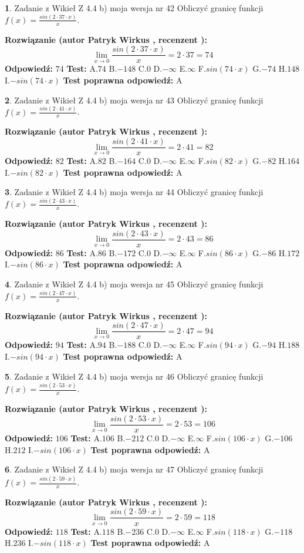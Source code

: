 \documentclass[12pt, a4paper]{article}
\theoremstyle{definition} %
\newtheorem{zad}{}
\newcommand{\zadStart}[1]{\begin{zad}#1\newline}
\newcommand{\zadStop}{\end{zad}}
\newcommand{\rozwStart}[2]{\noindent \textbf{Rozwiązanie (autor #1 , recenzent #2): }\newline}
\newcommand{\rozwStop}{\newline}
\newcommand{\odpStart}{\noindent \textbf{Odpowiedź:}\newline}
\newcommand{\odpStop}{\newline}
\newcommand{\testStart}{\noindent \textbf{Test:}\newline}
\newcommand{\testStop}{\newline}
\newcommand{\kluczStart}{\noindent \textbf{Test poprawna odpowiedź:}\newline}
\newcommand{\kluczStop}{\newline}
\begin{document}
\zadStart{Zadanie z Wikieł Z 4.4 b) moja wersja nr 42}
Obliczyć granicę funkcji $f(x)=\frac{sin(2 \cdot37\cdot x)}{x}$.
\zadStop
\rozwStart{Patryk Wirkus}{}
$$\lim\limits_{x\to 0}\frac{sin(2 \cdot 37\cdot x)}{x}=
2 \cdot 37 = 74$$
\rozwStop
\odpStart
$74$
\odpStop
\testStart
A.$74$
B.$-148$
C.$0$
D.$-\infty$
E.$\infty$
F.$sin(74\cdot x)$
G.$-74$
H.$148$
I.$-sin(74\cdot x)$
\testStop
\kluczStart
A
\kluczStop



\zadStart{Zadanie z Wikieł Z 4.4 b) moja wersja nr 43}
Obliczyć granicę funkcji $f(x)=\frac{sin(2 \cdot41\cdot x)}{x}$.
\zadStop
\rozwStart{Patryk Wirkus}{}
$$\lim\limits_{x\to 0}\frac{sin(2 \cdot 41\cdot x)}{x}=
2 \cdot 41 = 82$$
\rozwStop
\odpStart
$82$
\odpStop
\testStart
A.$82$
B.$-164$
C.$0$
D.$-\infty$
E.$\infty$
F.$sin(82\cdot x)$
G.$-82$
H.$164$
I.$-sin(82\cdot x)$
\testStop
\kluczStart
A
\kluczStop



\zadStart{Zadanie z Wikieł Z 4.4 b) moja wersja nr 44}
Obliczyć granicę funkcji $f(x)=\frac{sin(2 \cdot43\cdot x)}{x}$.
\zadStop
\rozwStart{Patryk Wirkus}{}
$$\lim\limits_{x\to 0}\frac{sin(2 \cdot 43\cdot x)}{x}=
2 \cdot 43 = 86$$
\rozwStop
\odpStart
$86$
\odpStop
\testStart
A.$86$
B.$-172$
C.$0$
D.$-\infty$
E.$\infty$
F.$sin(86\cdot x)$
G.$-86$
H.$172$
I.$-sin(86\cdot x)$
\testStop
\kluczStart
A
\kluczStop



\zadStart{Zadanie z Wikieł Z 4.4 b) moja wersja nr 45}
Obliczyć granicę funkcji $f(x)=\frac{sin(2 \cdot47\cdot x)}{x}$.
\zadStop
\rozwStart{Patryk Wirkus}{}
$$\lim\limits_{x\to 0}\frac{sin(2 \cdot 47\cdot x)}{x}=
2 \cdot 47 = 94$$
\rozwStop
\odpStart
$94$
\odpStop
\testStart
A.$94$
B.$-188$
C.$0$
D.$-\infty$
E.$\infty$
F.$sin(94\cdot x)$
G.$-94$
H.$188$
I.$-sin(94\cdot x)$
\testStop
\kluczStart
A
\kluczStop



\zadStart{Zadanie z Wikieł Z 4.4 b) moja wersja nr 46}
Obliczyć granicę funkcji $f(x)=\frac{sin(2 \cdot53\cdot x)}{x}$.
\zadStop
\rozwStart{Patryk Wirkus}{}
$$\lim\limits_{x\to 0}\frac{sin(2 \cdot 53\cdot x)}{x}=
2 \cdot 53 = 106$$
\rozwStop
\odpStart
$106$
\odpStop
\testStart
A.$106$
B.$-212$
C.$0$
D.$-\infty$
E.$\infty$
F.$sin(106\cdot x)$
G.$-106$
H.$212$
I.$-sin(106\cdot x)$
\testStop
\kluczStart
A
\kluczStop



\zadStart{Zadanie z Wikieł Z 4.4 b) moja wersja nr 47}
Obliczyć granicę funkcji $f(x)=\frac{sin(2 \cdot59\cdot x)}{x}$.
\zadStop
\rozwStart{Patryk Wirkus}{}
$$\lim\limits_{x\to 0}\frac{sin(2 \cdot 59\cdot x)}{x}=
2 \cdot 59 = 118$$
\rozwStop
\odpStart
$118$
\odpStop
\testStart
A.$118$
B.$-236$
C.$0$
D.$-\infty$
E.$\infty$
F.$sin(118\cdot x)$
G.$-118$
H.$236$
I.$-sin(118\cdot x)$
\testStop
\kluczStart
A
\kluczStop
\end{document}
